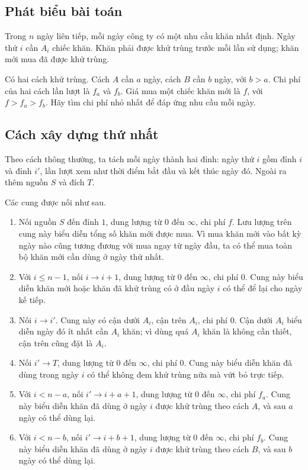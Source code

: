 \documentclass[11pt]{article}
\begin{document}
\subsection{Phát biểu bài toán}

Trong \(n\) ngày liên tiếp, mỗi ngày công ty có một nhu cầu khăn nhất định.
Ngày thứ \(i\) cần \(A_i\) chiếc khăn. Khăn phải được khử trùng trước mỗi lần
sử dụng; khăn mới mua đã được khử trùng.

Có hai cách khử trùng. Cách \(A\) cần \(a\) ngày, cách \(B\) cần \(b\) ngày,
với \(b>a\). Chi phí của hai cách lần lượt là \(f_a\) và \(f_b\). Giá mua một
chiếc khăn mới là \(f\), với \(f>f_a>f_b\). Hãy tìm chi phí nhỏ nhất để đáp
ứng nhu cầu mỗi ngày.

\subsection{Cách xây dựng thứ nhất}

Theo cách thông thường, ta tách mỗi ngày thành hai đỉnh: ngày thứ \(i\) gồm
đỉnh \(i\) và đỉnh \(i'\), lần lượt xem như thời điểm bắt đầu và kết thúc
ngày đó. Ngoài ra thêm nguồn \(S\) và đích \(T\).

Các cung được nối như sau.

\begin{enumerate}
  \item Nối nguồn \(S\) đến đỉnh \(1\), dung lượng từ \(0\) đến
  \(\infty\), chi phí \(f\). Lưu lượng trên cung này biểu diễn tổng số khăn
  mới được mua. Vì mua khăn mới vào bất kỳ ngày nào cũng tương đương với mua
  ngay từ ngày đầu, ta có thể mua toàn bộ khăn mới cần dùng ở ngày thứ nhất.
  \item Với \(i\le n-1\), nối \(i\to i+1\), dung lượng từ \(0\) đến
  \(\infty\), chi phí \(0\). Cung này biểu diễn khăn mới hoặc khăn đã khử
  trùng có ở đầu ngày \(i\) có thể để lại cho ngày kế tiếp.
  \item Nối \(i\to i'\). Cung này có cận dưới \(A_i\), cận trên \(A_i\), chi
  phí \(0\). Cận dưới \(A_i\) biểu diễn ngày đó ít nhất cần \(A_i\) khăn; vì
  dùng quá \(A_i\) khăn là không cần thiết, cận trên cũng đặt là \(A_i\).
  \item Nối \(i'\to T\), dung lượng từ \(0\) đến \(\infty\), chi phí \(0\).
  Cung này biểu diễn khăn đã dùng trong ngày \(i\) có thể không đem khử trùng
  nữa mà vứt bỏ trực tiếp.
  \item Với \(i<n-a\), nối \(i'\to i+a+1\), dung lượng từ \(0\) đến
  \(\infty\), chi phí \(f_a\). Cung này biểu diễn khăn đã dùng ở ngày \(i\)
  được khử trùng theo cách \(A\), và sau \(a\) ngày có thể dùng lại.
  \item Với \(i<n-b\), nối \(i'\to i+b+1\), dung lượng từ \(0\) đến
  \(\infty\), chi phí \(f_b\). Cung này biểu diễn khăn đã dùng ở ngày \(i\)
  được khử trùng theo cách \(B\), và sau \(b\) ngày có thể dùng lại.
\end{enumerate}
\end{document}
